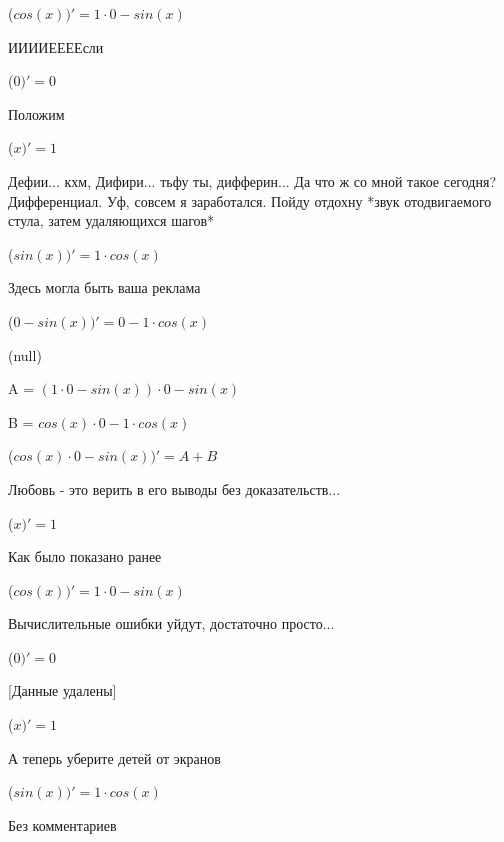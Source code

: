 \documentclass[12pt,a4paper,fleqn]{article}
\begin{document}
\begin{center}
 ($cos(x))'
  = 1 \cdot 0-sin(x)$\end{center}
ИИИИЕЕЕЕсли\cite{link3}

\begin{center}
 ($0)'
  = 0$\end{center}
Положим

\begin{center}
 ($x)'
  = 1$\end{center}
Дефии... кхм, Дифири... тьфу ты, дифферин... Да что ж со мной такое сегодня? Дифференциал. Уф, совсем я заработался. Пойду отдохну *звук отодвигаемого стула, затем удаляющихся шагов*

\begin{center}
 ($sin(x))'
  = 1 \cdot cos(x)$\end{center}
Здесь могла быть ваша реклама

\begin{center}
 ($0-sin(x))'
  = 0-1 \cdot cos(x)$\end{center}
(null)\cite{link4}

\begin{center}
A = $(1 \cdot 0-sin(x)) \cdot 0-sin(x)$\end{center}
\begin{center}
B = $cos(x) \cdot 0-1 \cdot cos(x)$\end{center}
\begin{center}
 ($cos(x) \cdot 0-sin(x))'
  = A+B$\end{center}
Любовь - это верить в его выводы без доказательств...

\begin{center}
 ($x)'
  = 1$\end{center}
Как было показано ранее

\begin{center}
 ($cos(x))'
  = 1 \cdot 0-sin(x)$\end{center}
Вычислительные ошибки уйдут, достаточно просто...

\begin{center}
 ($0)'
  = 0$\end{center}
[Данные удалены]

\begin{center}
 ($x)'
  = 1$\end{center}
А теперь уберите детей от экранов

\begin{center}
 ($sin(x))'
  = 1 \cdot cos(x)$\end{center}
Без комментариев\cite{link4}
\end{document}
